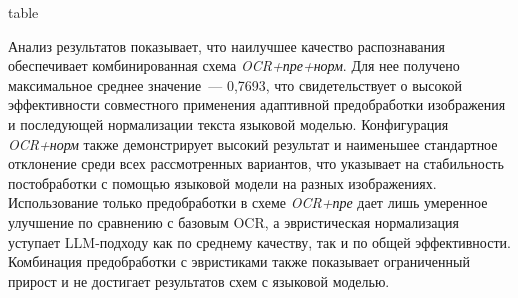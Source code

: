 \documentclass[11pt]{article}
\makeatletter
\def\bicaption@tablestr{table}
\newcommand{\bicaption}[2]{\caption{#1}\vspace{-0.7em}
	{\captionsetup{labelformat=empty}\edef\bicaption@type{\@captype}\ifx\bicaption@type\bicaption@tablestr
			\caption*{\textbf{Table~\thetable.} #2}\else
			\caption*{\textbf{Fig.~\thefigure.} #2}\fi
	}}
\makeatother
\begin{document}
\begin{multicols}{2}
\begin{table}[t]
	\centering
	\small
	\setlength{\tabcolsep}{4pt}
	\renewcommand{\arraystretch}{1.15}
	\bicaption{
		Результаты распознавания текста при различных конфигурациях OCR
		}{
		Text recognition results with various OCR configurations	
		}
	\label{tab:ocr_compare}
\end{table}

Анализ результатов показывает, что наилучшее качество распознавания обеспечивает комбинированная схема \textit{OCR+пре+норм}. Для нее получено максимальное среднее значение~--- 0,7693, что свидетельствует о высокой эффективности совместного применения адаптивной предобработки изображения и последующей нормализации текста языковой моделью.
Конфигурация \textit{OCR+норм} также демонстрирует высокий результат и наименьшее стандартное отклонение среди всех рассмотренных вариантов, что указывает на стабильность постобработки с помощью языковой модели на разных изображениях.
Использование только предобработки в схеме \textit{OCR+пре} дает лишь умеренное улучшение по сравнению с базовым OCR, а эвристическая нормализация уступает LLM-подходу как по среднему качеству, так и по общей эффективности. Комбинация предобработки с эвристиками также показывает ограниченный прирост и не достигает результатов схем с языковой моделью.


\end{multicols}
\end{document}
